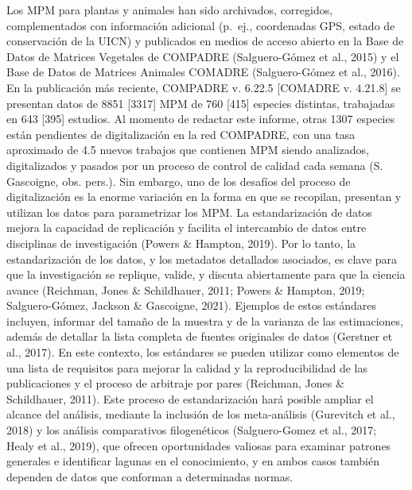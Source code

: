 \documentclass[
  12pt,
  letterpaper,
]{book}
\begin{document}
Los MPM para plantas y animales han sido archivados, corregidos,
complementados con información adicional (p.~ej., coordenadas GPS,
estado de conservación de la UICN) y publicados en medios de acceso
abierto en la Base de Datos de Matrices Vegetales de COMPADRE
(Salguero-Gómez et al., 2015) y el Base de Datos de Matrices Animales
COMADRE (Salguero-Gómez et al., 2016). En la publicación más reciente,
COMPADRE v. 6.22.5 {[}COMADRE v. 4.21.8{]} se presentan datos de 8851
{[}3317{]} MPM de 760 {[}415{]} especies distintas, trabajadas en 643
{[}395{]} estudios. Al momento de redactar este informe, otras 1307
especies están pendientes de digitalización en la red COMPADRE, con una
tasa aproximado de 4.5 nuevos trabajos que contienen MPM siendo
analizados, digitalizados y pasados por un proceso de control de calidad
cada semana (S. Gascoigne, obs. pers.). Sin embargo, uno de los desafíos
del proceso de digitalización es la enorme variación en la forma en que
se recopilan, presentan y utilizan los datos para parametrizar los MPM.
La estandarización de datos mejora la capacidad de replicación y
facilita el intercambio de datos entre disciplinas de investigación
(Powers \& Hampton, 2019). Por lo tanto, la estandarización de los
datos, y los metadatos detallados asociados, es clave para que la
investigación se replique, valide, y discuta abiertamente para que la
ciencia avance (Reichman, Jones \& Schildhauer, 2011; Powers \& Hampton,
2019; Salguero-Gómez, Jackson \& Gascoigne, 2021). Ejemplos de estos
estándares incluyen, informar del tamaño de la muestra y de la varianza
de las estimaciones, además de detallar la lista completa de fuentes
originales de datos (Gerstner et al., 2017). En este contexto, los
estándares se pueden utilizar como elementos de una lista de requisitos
para mejorar la calidad y la reproducibilidad de las publicaciones y el
proceso de arbitraje por pares (Reichman, Jones \& Schildhauer, 2011).
Este proceso de estandarización hará posible ampliar el alcance del
análisis, mediante la inclusión de los meta-análisis (Gurevitch et al.,
2018) y los análisis comparativos filogenéticos (Salguero-Gomez et al.,
2017; Healy et al., 2019), que ofrecen oportunidades valiosas para
examinar patrones generales e identificar lagunas en el conocimiento, y
en ambos casos también dependen de datos que conforman a determinadas
normas.
\end{document}
